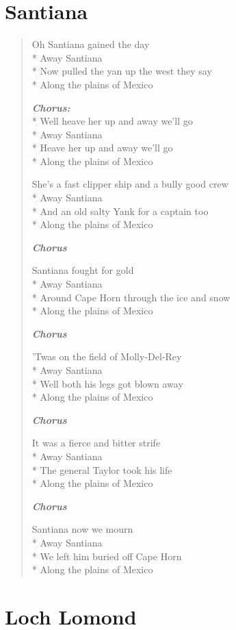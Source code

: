\documentclass[9pt,twoside]{extarticle}
\newenvironment{xverse}{
	\begin{verse}
	\fontsize{8.5}{10.5}\selectfont
	}
	{
	\end{verse}
	\penalty 0
}
\newcommand{\chorusdef}{\textbf{\emph{Chorus:}}\\*}
\newcommand{\chorusmark}[1][1]{%
\vspace{-0.5\stanzaskip}%
\textbf{\emph{Chorus \ifthenelse{\equal{#1}{1}}{}{$\times$ #1}}}%
\vspace{-0.5\stanzaskip}%
}
\begin{document}
\section{Santiana}
\begin{xverse}
Oh Santiana gained the day \\*
Away Santiana \\*
Now pulled the yan up the west they say \\*
Along the plains of Mexico

\chorusdef
Well heave her up and away we’ll go \\*
Away Santiana \\*
Heave her up and away we’ll go \\*
Along the plains of Mexico

She’s a fast clipper ship and a bully good crew \\*
Away Santiana \\*
And an old salty Yank for a captain too \\*
Along the plains of Mexico

\chorusmark

Santiana fought for gold \\*
Away Santiana \\*
Around Cape Horn through the ice and snow \\*
Along the plains of Mexico

\chorusmark

’Twas on the field of Molly-Del-Rey \\*
Away Santiana \\*
Well both his legs got blown away \\*
Along the plains of Mexico

\chorusmark

It was a fierce and bitter strife \\*
Away Santiana \\*
The general Taylor took his life \\*
Along the plains of Mexico

\chorusmark

Santiana now we mourn \\*
Away Santiana \\*
We left him buried off Cape Horn \\*
Along the plains of Mexico
\end{xverse}


\section{Loch Lomond}
\end{document}
